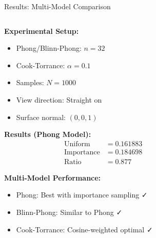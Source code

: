 \documentclass[aspectratio=169]{beamer}
\begin{document}
\begin{frame}{Results: Multi-Model Comparison}
    \begin{columns}
        \begin{column}{0.6\textwidth}
            \textbf{Experimental Setup:}
            \begin{itemize}
                \item Phong/Blinn-Phong: $n = 32$
                \item Cook-Torrance: $\alpha = 0.1$
                \item Samples: $N = 1000$
                \item View direction: Straight on
                \item Surface normal: $(0,0,1)$
            \end{itemize}
            
            \vspace{0.5cm}
            \textbf{Results (Phong Model):}
            \begin{align}
                \text{Uniform} &= 0.161883 \\
                \text{Importance} &= 0.184698 \\
                \text{Ratio} &= 0.877
            \end{align}
            
            \textbf{Multi-Model Performance:}
            \begin{itemize}
                \item Phong: Best with importance sampling ✓
                \item Blinn-Phong: Similar to Phong ✓
                \item Cook-Torrance: Cosine-weighted optimal ✓
            \end{itemize}
        \end{column}
        \begin{column}{0.4\textwidth}
\end{column}
\end{columns}
\end{frame}
\end{document}

